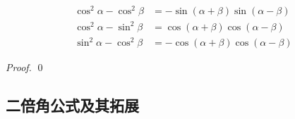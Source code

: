 \begin{corollary}
     \begin{align*}
    \cos^2\alpha - \cos^2\beta &= -\sin(\alpha+\beta)\sin(\alpha-\beta) \\
    \cos^2\alpha - \sin^2\beta &= \cos(\alpha+\beta)\cos(\alpha-\beta) \\
    \sin^2\alpha - \cos^2\beta &= -\cos(\alpha+\beta)\cos(\alpha-\beta)
\end{align*}
\end{corollary}
\begin{proof}
    \qed
\end{proof}


















\clearpage
\subsection{二倍角公式及其拓展}
\clearpage
